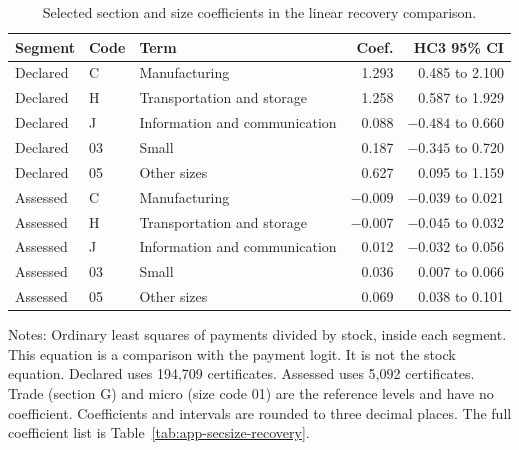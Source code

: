 \begin{table}[H]
\centering
\caption{Selected section and size coefficients in the linear recovery comparison.}\label{tab:secsize-recovery}
\footnotesize
\begin{tabular}{@{}llp{3.6cm}rr@{}}
\toprule
Segment & Code & Term & Coef. & HC3 95\% CI \\
\midrule
Declared & C & Manufacturing & 1.293 & 0.485 to 2.100 \\
Declared & H & Transportation and storage & 1.258 & 0.587 to 1.929 \\
Declared & J & Information and communication & 0.088 & $-0.484$ to 0.660 \\
Declared & 03 & Small & 0.187 & $-0.345$ to 0.720 \\
Declared & 05 & Other sizes & 0.627 & 0.095 to 1.159 \\
Assessed & C & Manufacturing & $-0.009$ & $-0.039$ to 0.021 \\
Assessed & H & Transportation and storage & $-0.007$ & $-0.045$ to 0.032 \\
Assessed & J & Information and communication & 0.012 & $-0.032$ to 0.056 \\
Assessed & 03 & Small & 0.036 & 0.007 to 0.066 \\
Assessed & 05 & Other sizes & 0.069 & 0.038 to 0.101 \\
\bottomrule
\end{tabular}

\vspace{0.4em}
\begin{minipage}{0.95\textwidth}
\footnotesize
Notes: Ordinary least squares of payments divided by stock, inside each segment. This equation is a comparison with the payment logit. It is not the stock equation. Declared uses 194,709 certificates. Assessed uses 5,092 certificates. Trade (section G) and micro (size code 01) are the reference levels and have no coefficient. Coefficients and intervals are rounded to three decimal places. The full coefficient list is Table~\ref{tab:app-secsize-recovery}.
\end{minipage}
\end{table}
